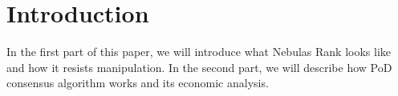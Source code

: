 \section{Introduction}

In the first part of this paper, we will introduce what Nebulas Rank looks like and how it resists manipulation. In the second part,
we will describe how PoD consensus algorithm works and its economic analysis.
